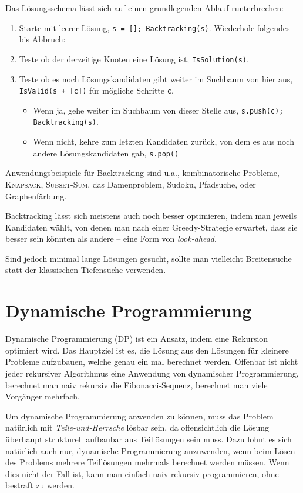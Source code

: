 Das Lösungsschema lässt sich auf einen grundlegenden Ablauf runterbrechen:
\begin{enumerate}
    \item Starte mit leerer Lösung, \lstinline|s = []; Backtracking(s)|.
        Wiederhole folgendes bis Abbruch:

    \item Teste ob der derzeitige Knoten eine Lösung ist, \lstinline|IsSolution(s)|.

    \item Teste ob es noch Lösungskandidaten gibt weiter im Suchbaum von hier aus, \lstinline|IsValid(s + [c])| für mögliche Schritte \lstinline|c|.
        \begin{itemize}
            \item Wenn ja, gehe weiter im Suchbaum von dieser Stelle aus, \lstinline|s.push(c); Backtracking(s)|.

            \item Wenn nicht, kehre zum letzten Kandidaten zurück, von dem es aus noch andere Lösungskandidaten gab, \lstinline|s.pop()|
        \end{itemize}
\end{enumerate}
Anwendungsbeispiele für Backtracking sind u.a., kombinatorische Probleme, \textsc{Knapsack}, \textsc{Subset-Sum}, das Damenproblem, Sudoku, Pfadsuche, oder Graphenfärbung.

Backtracking lässt sich meistens auch noch besser optimieren, indem man jeweils Kandidaten wählt, von denen man nach einer Greedy-Strategie erwartet, dass sie besser sein könnten als andere -- eine Form von \emph{look-ahead}.

Sind jedoch minimal lange Lösungen gesucht, sollte man vielleicht Breitensuche statt der klassischen Tiefensuche verwenden.

\section{Dynamische Programmierung}
Dynamische Programmierung (DP) ist ein Ansatz, indem eine Rekursion optimiert wird.
Das Hauptziel ist es, die Lösung aus den Lösungen für kleinere Probleme aufzubauen, welche genau ein mal berechnet werden.
Offenbar ist nicht jeder rekursiver Algorithmus eine Anwendung von dynamischer Programmierung, berechnet man naiv rekursiv die Fibonacci-Sequenz, berechnet man viele Vorgänger mehrfach.

Um dynamische Programmierung anwenden zu können, muss das Problem natürlich mit \emph{Teile-und-Herrsche} lösbar sein, da offensichtlich die Lösung überhaupt strukturell aufbaubar aus Teillösungen sein muss.
Dazu lohnt es sich natürlich auch nur, dynamische Programmierung anzuwenden, wenn beim Lösen des Problems mehrere Teillösungen mehrmals berechnet werden müssen.
Wenn dies nicht der Fall ist, kann man einfach naiv rekursiv programmieren, ohne bestraft zu werden.

